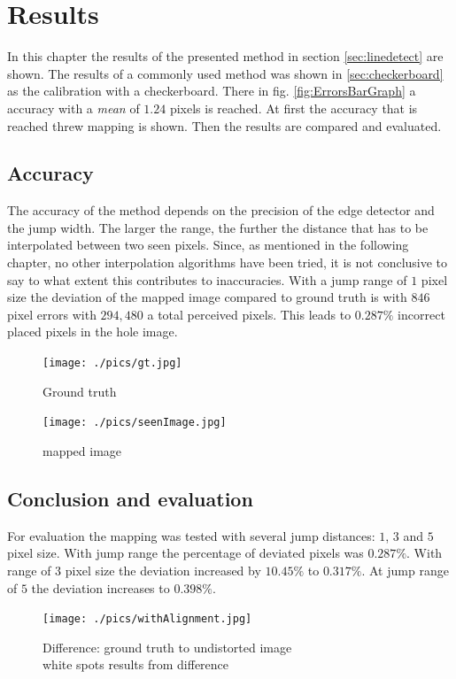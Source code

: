 \documentclass[journal,final,a4paper,twoside]{PS}
\begin{document}
\section{Results}
\label{sec:results}
In this chapter the results of the presented method in section \ref{sec:linedetect} are shown. The results of a commonly used method was shown in \ref{sec:checkerboard} as the calibration with a checkerboard. There in fig. \ref{fig:ErrorsBarGraph} a accuracy with a \emph{mean} of $1.24$ pixels is reached. At first the accuracy that is reached threw mapping is shown. Then the results are compared and evaluated.
\subsection{Accuracy}

The accuracy of the method depends on the precision of the edge detector and the jump width. The larger the range, the further the distance that has to be interpolated between two seen pixels. Since, as mentioned in the following chapter, no other interpolation algorithms have been tried, it is not conclusive to say to what extent this contributes to inaccuracies. With a jump range of $1$ pixel size the deviation of the mapped image compared to ground truth is with $846$ pixel errors with $294,480$ a total perceived pixels. This leads to $0.287\%$ incorrect placed pixels in the hole image.

\begin{figure}[h]
\centering
\parbox{4cm}{
\texttt{[image: ./pics/gt.jpg]}
\caption{Ground truth}
\label{fig:gt}}
\qquad
\begin{minipage}{4cm}
\texttt{[image: ./pics/seenImage.jpg]}
\caption{mapped image}
\label{fig:undistImage}
\end{minipage}
\end{figure}



\subsection{Conclusion and evaluation}
\label{sec:conclusion}
For evaluation the mapping was tested with several jump distances: $1$, $3$ and $5$ pixel size. With jump range the percentage of deviated pixels was $0.287\%$. With range of $3$ pixel size the deviation increased by $10.45\%$ to $0.317\%$. At jump range of $5$ the deviation increases to $0.398\%$. 

\begin{figure}[h]
\begin{center}
\texttt{[image: ./pics/withAlignment.jpg]}
\caption{Difference: ground truth to undistorted image\\ white spots results from difference}
\label{fig:diff}
\end{center}
\end{figure}
\end{document}
